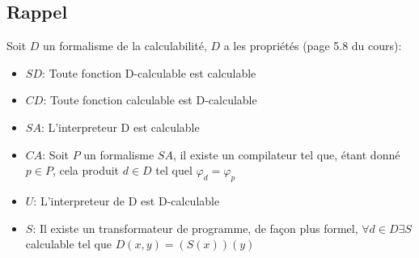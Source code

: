 \subsection*{Rappel}
Soit $D$ un formalisme de la calculabilité, $D$ a les propriétés (page 5.8 du cours):
\begin{itemize}
\item $SD$: Toute fonction D-calculable est calculable
\item $CD$: Toute fonction calculable est D-calculable
\item $SA$: L'interpreteur D est calculable
\item $CA$: Soit $P$ un formalisme $SA$, il existe un compilateur tel que, étant donné $p\in P$, cela produit $d \in D$ tel quel $\varphi_d = \varphi_p$
\item $U$: L'interpreteur de D est D-calculable
\item $S$: Il existe un transformateur de programme, de façon plus formel, $\forall d \in D \exists S$ calculable tel que $D(x,y) = (S(x))(y)$
\end{itemize}

